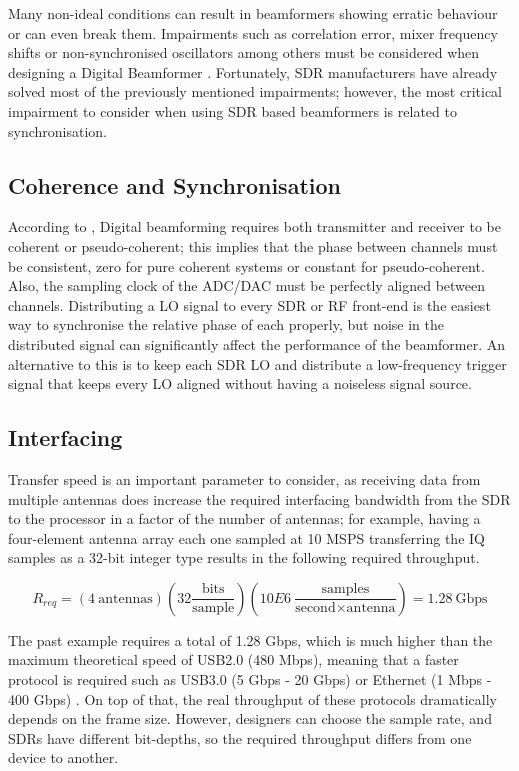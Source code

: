 \documentclass[12pt,a4paper]{report}
\begin{document}
Many non-ideal conditions can result in beamformers showing erratic behaviour or can even break them. Impairments such as correlation error, mixer frequency shifts or non-synchronised oscillators among others must be considered when designing a Digital Beamformer \cite{Delos2017}. Fortunately, SDR manufacturers have already solved most of the previously mentioned impairments; however, the most critical impairment to consider when using SDR based beamformers is related to synchronisation.

\subsection{Coherence and Synchronisation} \label{back:bf_sdr:sync}
According to \cite{Delos2017, AD2017}, Digital beamforming requires both transmitter and receiver to be coherent or pseudo-coherent; this implies that the phase between channels must be consistent, zero for pure coherent systems or constant for pseudo-coherent. Also, the sampling clock of the ADC/DAC must be perfectly aligned between channels. Distributing a LO signal to every SDR or RF front-end is the easiest way to synchronise the relative phase of each properly, but noise in the distributed signal can significantly affect the performance of the beamformer. An alternative to this is to keep each SDR LO and distribute a low-frequency trigger signal that keeps every LO aligned without having a noiseless signal source.

\subsection{Interfacing} \label{back:bf_sdr:int}
Transfer speed is an important parameter to consider, as receiving data from multiple antennas does increase the required interfacing bandwidth from the SDR to the processor in a factor of the number of antennas; for example, having a four-element antenna array each one sampled at 10 MSPS transferring the IQ samples as a 32-bit integer type results in the following required throughput.

\begin{equation*}
    R_{req} = (4 \: \text{antennas}) (32 \frac{\text{bits}}{\text{sample}}) (10E6 \: \frac{\text{samples}}{\text{second} \times \text{antenna}}) = 1.28 \: \text{Gbps}
\end{equation*}

The past example requires a total of 1.28 Gbps, which is much higher than the maximum theoretical speed of USB2.0 (480 Mbps), meaning that a faster protocol is required such as USB3.0 (5 Gbps - 20 Gbps) or Ethernet (1 Mbps - 400 Gbps) \cite{USB2, USB3, Ethernet}. On top of that, the real throughput of these protocols dramatically depends on the frame size. However, designers can choose the sample rate, and SDRs have different bit-depths, so the required throughput differs from one device to another.
\end{document}
